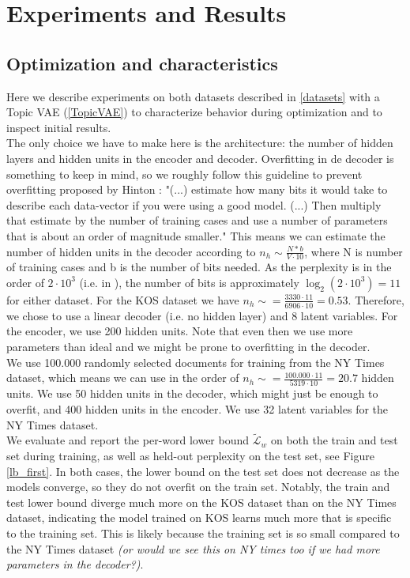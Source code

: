 \documentclass{report}
\begin{document}
	


	\section{Experiments and Results}
	
	
	\subsection{Optimization and characteristics}\label{exp1}
	
	Here we describe experiments on both datasets described in \ref{datasets} with a Topic VAE (\ref{TopicVAE}) to characterize behavior during optimization and to inspect initial results. \\
	The only choice we have to make here is the architecture: the number of hidden layers and hidden units in the encoder and decoder. Overfitting in de decoder is something to keep in mind, so we roughly follow this guideline to prevent overfitting proposed by Hinton \cite{hinton2012neural}: "(...) estimate how many bits it would take to describe each data-vector if you were using a good model. (...) Then multiply that estimate by the number of training cases and use a number of parameters that is about an order of magnitude smaller." This means we can estimate the number of hidden units in the decoder according to $n_h \sim \frac{N*b}{V \cdot 10}$, where N is number of training cases and b is the number of bits needed. As the perplexity is in the order of $2 \cdot 10^3$ (i.e. in \cite{ranganath2015deep}), the number of bits is approximately $\log_2(2 \cdot 10^3) = 11$ for either dataset. For the KOS dataset we have $n_h \sim = \frac{3330 \cdot 11}{6906\cdot 10} = 0.53$. Therefore, we chose to use a linear decoder (i.e. no hidden layer) and 8 latent variables. For the encoder, we use 200 hidden units. Note that even then we use more parameters than ideal and we might be prone to overfitting in the decoder. \\
	We use 100.000 randomly selected documents for training from the NY Times dataset, which means we can use in the order of $n_h \sim = \frac{100.000 \cdot 11}{5319\cdot 10} = 20.7$ hidden units. We use 50 hidden units in the decoder, which might just be enough to overfit, and 400 hidden units in the encoder. We use 32 latent variables for the NY Times dataset. \\
	We evaluate and report the per-word lower bound $\tilde{\mathcal{L}}_w$ on both the train and test set during training, as well as held-out perplexity on the test set, see Figure \ref{lb_first}. In both cases, the lower bound on the test set does not decrease as the models converge, so they do not overfit on the train set. Notably, the train and test lower bound diverge much more on the KOS dataset than on the NY Times dataset, indicating the model trained on KOS learns much more that is specific to the training set. This is likely because the training set is so small compared to the NY Times dataset \textit{(or would we see this on NY times too if we had more parameters in the decoder?)}.\\
\end{document}
